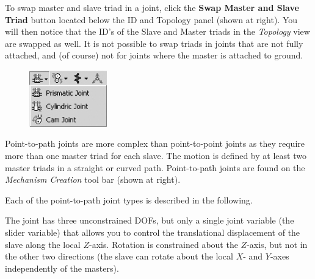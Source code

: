 To swap master and slave triad in a joint, click the \textbf{Swap Master
and Slave Triad} button located below the ID and Topology panel (shown
at right). You will then notice that the ID's of the Slave and Master
triads in the {\sl Topology} view are swapped as well. It is not
possible to swap triads in joints that are not fully attached, and (of
course) not for joints where the master is attached to ground.



\begin{figure}
  \vspace{-4mm}
  \center
  \includegraphics[width=0.3\textwidth]{Figures/2nd_Joint_Pulldown_Window}
\end{figure}

Point-to-path joints are more complex than
point-to-point joints as they require more than one master triad for
each slave. The motion is defined by at least two master triads in a
straight or curved path. Point-to-path joints are found on the
{\sl Mechanism Creation} tool bar (shown at right).


\medskip\noindent
Each of the point-to-path joint types is described in the following.




The joint has three unconstrained DOFs, but only a single joint variable
(the slider variable) that allows you to control the translational displacement
of the slave along the local $Z$-axis.
Rotation is constrained about the $Z$-axis, but not in the other two directions
(the slave can rotate about the local $X$- and $Y$-axes
independently of the masters).

